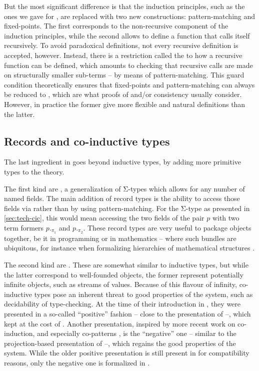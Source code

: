 But the most significant difference is that the induction principles,
such as the ones we gave for ,
are replaced with two new constructions: pattern-matching and fixed-points. The
first corresponds to the non-recursive component of the induction principles, while the
second allows to define a function that calls itself recursively.
To avoid paradoxical definitions, not every recursive definition is accepted, however.
\AP Instead, there is a restriction called the 
to how a recursive function
can be defined, which amounts to checking that recursive calls are made on
structurally smaller sub-terms – by means of pattern-matching. This guard condition
theoretically ensures that fixed-points and pattern-matching can always be reduced to
 , which are what proofs of  and/or
consistency usually consider.
However, in practice the former give more
flexible and natural definitions than the latter.

\subsection{Records and co-inductive types}
\label{sec:pcuic-records}

The last ingredient in  goes beyond inductive types, by adding more primitive types
to the theory.

\AP The first kind are ,
a generalization of Σ-types which allows for any number of
named fields. The main addition of record types is the ability to access those fields via
 rather than by using pattern-matching. For the Σ-type as presented in
\cref{sec:tech-cic}, this would mean accessing the two fields of the pair $p$ with two
term formers $p._{\pi_{1}}$ and $p._{\pi_{2}}$. These record types are very useful to package
objects together, be it in programming or in mathematics – where such bundles are ubiquitous,
for instance when formalizing hierarchies of mathematical structures .

\AP The second kind are .
These are somewhat similar to inductive types, but
while the latter correspond to well-founded objects, the former represent
potentially infinite objects, such as streams of values. Because of this flavour of infinity,
co-inductive types pose an inherent threat to good properties of the system, such as
decidability of type-checking. At the time of their introduction in 
, they were presented in a so-called “positive” fashion – close
to the presentation of  –, which
kept  at the cost of .
Another presentation, inspired by more recent work on
co-induction, and especially co-patterns , is the “negative” one –
similar to the projection-based presentation of  –,
which regains the good properties of the system. While the older positive presentation
is still present in  for compatibility reasons,
only the negative one is formalized in .
